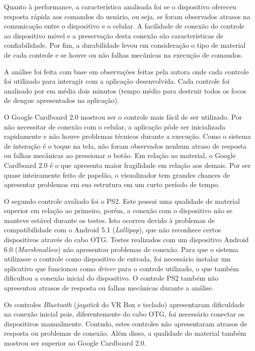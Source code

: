 Quanto à performance, a característica analisada foi se o dispositivo ofereceu resposta rápida aos comandos do usuário, ou seja, se foram observados atrasos na comunicação entre o dispositivo e o celular. A facilidade de conexão do controle ao dispositivo móvel e a preservação desta conexão são características de confiabilidade. Por fim, a durabilidade levou em consideração o tipo de material de cada controle e se houve ou não falhas mecânicas na execução de comandos.

A análise foi feita com base em observações feitas pela autora onde cada controle foi utilizado para interagir com a aplicação desenvolvida. Cada controle foi analisado por em média dois minutos (tempo médio para destruir todos os focos de dengue apresentados na aplicação).

O Google Cardboard 2.0 mostrou ser o controle mais fácil de ser utilizado. Por não necessitar de conexão com o celular, a aplicação pôde ser inicializada rapidamente e não houve problemas técnicos durante a execução. Como o sistema de interação é o toque na tela, não foram observados nenhum atraso de resposta ou falhas mecânicas ao pressionar o botão. Em relação ao material, o Google Cardboard 2.0 é o que apresenta maior fragilidade em relação aos demais. Por ser quase inteiramente feito de papelão, o visualizador tem grandes chances de apresentar problemas em sua estrutura em um curto período de tempo. 

O segundo controle avaliado foi o PS2. Este possui uma qualidade de material superior em relação ao primeiro, porém, a conexão com o dispositivo não se manteve estável durante os testes. Isto ocorreu devido à problemas de compatibilidade com o Android 5.1 (\textit{Lollipop}), que não reconhece certos dispositivos através do cabo OTG. Testes realizados com um dispositivo Android 6.0 (\textit{Marshmallow}) não apresentou problemas de conexão. Para que o sistema utilizasse o controle como dispositivo de entrada, foi necessário instalar um aplicativo que funcionou como \textit{driver} para o controle utilizado, o que também dificultou a conexão inicial do dispositivo. O controle PS2 também não apresentou atrasos de resposta ou falhas mecânicas durante a análise.

Os controles \textit{Bluetooth} (\textit{joystick} do VR Box e teclado) apresentaram dificuldade na conexão inicial pois, diferentemente do cabo OTG, foi necessário conectar os dispositivos manualmente. Contudo, estes controles não apresentaram atrasos de resposta ou problemas de conexão. Além disso, a qualidade do material também mostrou ser superior ao Google Cardboard 2.0.

